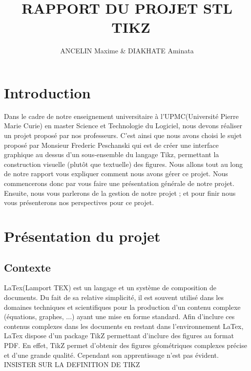 \documentclass[a4paper]{report}
\title{RAPPORT DU PROJET STL \\ TIKZ}
\author{ANCELIN Maxime & DIAKHATE Aminata}
\begin{document}

 \maketitle
 \tableofcontents
 \newpage



 \newpage
 \section{Introduction}
  Dans le cadre de notre enseignement universitaire à l'UPMC(Université Pierre Marie Curie) en master Science et Technologie du Logiciel, nous devons réaliser un projet proposé par nos professeurs. C'est ainsi que nous avons choisi le sujet proposé par Monsieur Frederic Peschanski qui est de créer une interface graphique au dessus d'un sous-ensemble du langage Tikz, permettant la construction visuelle (plutôt que textuelle) des figures. 
  \newline
  Nous allons tout au long de notre rapport vous expliquer comment nous avons gérer ce projet. Nous commencerons donc par vous faire une présentation générale de notre projet. Ensuite, nous vous parlerons de la gestion de notre projet ; et pour finir nous vous présenterons nos perspectives pour ce projet.
  \section{Présentation du projet}
  \subsection{Contexte}
  LaTex(Lamport TEX) est un langage et un système de composition de documents. Du fait de sa relative simplicité, il est souvent utilisé dans les domaines techniques et scientifiques pour la production d'un contenu complexe (équations, graphes, ...) ayant une mise en forme standard. Afin d'inclure ces contenus complexes dans les documents en restant dans l'environnement LaTex, LaTex dispose d'un package TikZ permettant d'inclure des figures au format PDF. En effet, TikZ permet d'obtenir des figures géométriques complexes précise et d'une grande qualité. Cependant son apprentissage n'est pas évident. 
  \newline
  INSISTER SUR LA DEFINITION DE TIKZ
\end{document}

